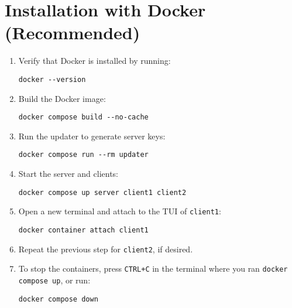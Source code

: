 \section{Installation with Docker (Recommended)}
\label{sec:docker}

\begin{enumerate}
    \item Verify that Docker is installed by running:

        \begin{lstlisting}
docker --version
        \end{lstlisting}

    \item Build the Docker image:

        \begin{lstlisting}
docker compose build --no-cache
        \end{lstlisting}

    \item Run the updater to generate server keys:

        \begin{lstlisting}
docker compose run --rm updater
        \end{lstlisting}

    \item Start the server and clients:

        \begin{lstlisting}
docker compose up server client1 client2
        \end{lstlisting}

    \item Open a new terminal and attach to the TUI of \texttt{client1}:

        \begin{lstlisting}
docker container attach client1
        \end{lstlisting}

    \item Repeat the previous step for \texttt{client2}, if desired.

    \item To stop the containers, press \texttt{CTRL+C} in the terminal where you ran \texttt{docker compose up}, or run:

        \begin{lstlisting}
docker compose down
        \end{lstlisting}
\end{enumerate}


